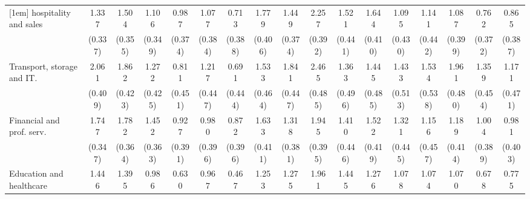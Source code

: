 {\begin{tabular}{l*{16}{c}}
[1em]
hospitality and sales&       1.337\sym{***}&       1.504\sym{***}&       1.106\sym{**} &       0.987\sym{**} &       1.077\sym{**} &       0.713         &       1.779\sym{***}&       1.449\sym{***}&       2.257\sym{***}&       1.521\sym{***}&       1.644\sym{***}&       1.095\sym{*}  &       1.141\sym{**} &       1.087\sym{**} &       0.762\sym{*}  &       0.865\sym{*}  \\
                    &     (0.337)         &     (0.355)         &     (0.349)         &     (0.374)         &     (0.384)         &     (0.388)         &     (0.406)         &     (0.374)         &     (0.392)         &     (0.441)         &     (0.410)         &     (0.430)         &     (0.442)         &     (0.399)         &     (0.372)         &     (0.387)         \\
[1em]
Transport, storage and IT.&       2.061\sym{***}&       1.862\sym{***}&       1.272\sym{**} &       0.811         &       1.217\sym{**} &       0.691         &       1.533\sym{***}&       1.841\sym{***}&       2.465\sym{***}&       1.363\sym{**} &       1.445\sym{**} &       1.433\sym{**} &       1.534\sym{**} &       1.961\sym{***}&       1.359\sym{**} &       1.171\sym{*}  \\
                    &     (0.409)         &     (0.423)         &     (0.425)         &     (0.451)         &     (0.447)         &     (0.444)         &     (0.464)         &     (0.447)         &     (0.485)         &     (0.496)         &     (0.485)         &     (0.513)         &     (0.538)         &     (0.480)         &     (0.454)         &     (0.471)         \\
[1em]
Financial and prof. serv.&       1.747\sym{***}&       1.782\sym{***}&       1.452\sym{***}&       0.927\sym{*}  &       0.980\sym{*}  &       0.872\sym{*}  &       1.633\sym{***}&       1.318\sym{***}&       1.945\sym{***}&       1.410\sym{**} &       1.522\sym{***}&       1.321\sym{**} &       1.156\sym{*}  &       1.189\sym{**} &       1.004\sym{**} &       0.981\sym{*}  \\
                    &     (0.347)         &     (0.364)         &     (0.363)         &     (0.391)         &     (0.396)         &     (0.396)         &     (0.411)         &     (0.381)         &     (0.395)         &     (0.446)         &     (0.419)         &     (0.445)         &     (0.457)         &     (0.414)         &     (0.389)         &     (0.403)         \\
[1em]
Education and healthcare&       1.446\sym{***}&       1.395\sym{***}&       0.986\sym{**} &       0.630         &       0.967\sym{*}  &       0.467         &       1.253\sym{**} &       1.275\sym{***}&       1.961\sym{***}&       1.445\sym{**} &       1.276\sym{**} &       1.078\sym{*}  &       1.074\sym{*}  &       1.070\sym{**} &       0.678         &       0.775         \\

\end{tabular}}

